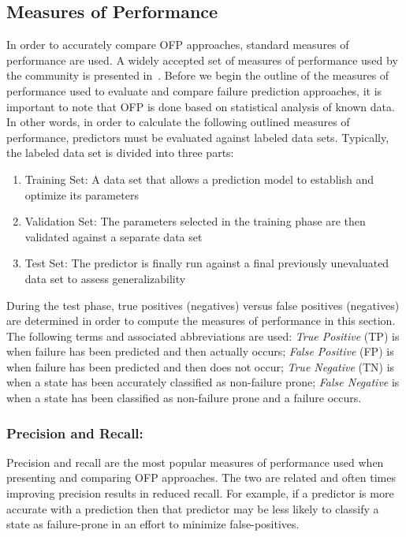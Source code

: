 \subsection{Measures of Performance} \label{metrics}
In order to accurately compare OFP approaches, standard measures of performance are used.  A widely accepted set of measures of performance used by the community is presented in~\cite{salfnerSurvey}.  Before we begin the outline of the measures of performance used to evaluate and compare failure prediction approaches, it is important to note that OFP is done based on statistical analysis of known data.  In other words, in order to calculate the following outlined measures of performance, predictors must be evaluated against labeled data sets.  Typically, the labeled data set is divided into three parts:
\begin{enumerate}
\item{Training Set:  A data set that allows a prediction model to establish and optimize its parameters}
\item{Validation Set:  The parameters selected in the training phase are then validated against a separate data set}
\item{Test Set:  The predictor is finally run against a final previously unevaluated data set to assess generalizability}
\end{enumerate}
During the test phase, true positives (negatives) versus false positives (negatives) are determined in order to compute the measures of performance in this section.  The following terms and associated abbreviations are used: \emph{True Positive} (TP) is when failure has been predicted and then actually occurs; \emph{False Positive} (FP) is when failure has been predicted and then does not occur; \emph{True Negative} (TN) is when a state has been accurately classified as non-failure prone; \emph{False Negative} is when a state has been classified as non-failure prone and a failure occurs.

\subsubsection{Precision and Recall:}
Precision and recall are the most popular measures of performance used when presenting and comparing OFP approaches.  The two are related and often times improving precision results in reduced recall.  For example, if a predictor is more accurate with a prediction then that predictor may be less likely to classify a state as failure-prone in an effort to minimize false-positives.

